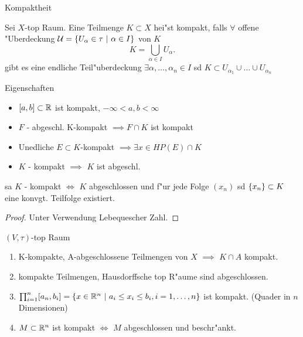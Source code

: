 \documentclass[class=article, crop=false]{standalone}
\begin{document}
\begin{zettel}{Kompaktheit}
\begin{definition}

	Sei $X$-top Raum. Eine Teilmenge $K \subset X$ hei"st kompakt, falls $\forall $
	offene "Uberdeckung $\mathcal{U} =\set{U_{\alpha}\in \tau}{\alpha \in I}$ von
	$K$
	\[
		K = \bigcup_{\alpha \in  I} U_\alpha
	.\]
	gibt es eine endliche Teil"uberdeckung $\exists \alpha, \dots, \alpha_n \in I$
	sd $K \subset U_{\alpha_{1}} \cup \dots \cup U_{\alpha_n}$
\end{definition}

\begin{remark}
	Eigenschaften
	\begin{itemize}
		\item $[a,b] \subset \mathbb{R}$ ist kompakt,  $-\infty < a,b < \infty $
		\item $F$ - abgeschl. K-kompakt $\implies F \cap K$ ist kompakt
		\item Unedliche $E \subset K $-kompakt $\implies \exists x \in HP (E) \cap K$
		\item $K$ - kompakt $\implies $ $K$ ist abgeschl.
	\end{itemize}
\end{remark}

\begin{theorem}

	sa $K$ - kompakt $\iff $ $K$ abgeschlossen und f"ur jede Folge $(x_n )$ sd
	$\set{x_n } \subset K$ eine konvgt. Teilfolge existiert.

	\begin{proof}
		Unter Verwendung Lebequescher Zahl.
	\end{proof}
\end{theorem}
\begin{theorem}
	$(V,\tau)$-top Raum
	\begin{enumerate}
		\item K-kompakte, A-abgeschlossene Teilmengen von $X$ $\implies $ $K \cap A$ kompakt.
		\item kompakte Teilmengen, Hausdorffsche top R"aume sind abgeschlossen.
		\item $\prod_{i=1}^n [a_n,b_i] = \set{x \in  \R ^{n}}{ a_i \leq x_i \leq  b_i, i=1,\dots,n}$
		      ist kompakt. (Quader in $n$ Dimensionen)
		\item $M \subset  \mathbb{R} ^n$ ist kompakt $\iff $ $M$ abgeschlossen und beschr"ankt.
	\end{enumerate}
\end{theorem}


\end{zettel}
\end{document}
